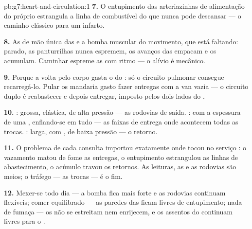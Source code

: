 \begin{solution}{pb:g7:heart-and-circulation:1}
\textbf{7.} O entupimento das arteriazinhas de alimentação do próprio
 estrangula a linha de combustível do  que nunca pode
descansar --- o caminho clássico para um infarto.

\textbf{8.} As  de mão única das  e a bomba muscular do
movimento, que está faltando: parado, as panturrilhas nunca espremem,
os avanços das  empacam e os  acumulam. Caminhar
espreme as  com ritmo --- o alívio é mecânico.

\textbf{9.} Porque a volta pelo corpo gasta o  do : só o
circuito pulmonar consegue recarregá-lo. Pular os  mandaria
 gasto fazer entregas com a van vazia --- o circuito duplo é
reabastecer e depois entregar, imposto pelos dois lados do .

\textbf{10.} : grossa, elástica, de alta pressão --- as rodovias
de saída. : com a espessura de uma , enfiando-se em tudo
--- as faixas de entrega onde acontecem todas as trocas. : larga,
com , de baixa pressão --- o retorno.

\textbf{11.} O problema de cada consulta importou exatamente onde
tocou no serviço : o vazamento matou de fome as entregas, o
entupimento estrangulou as linhas de abastecimento, o acúmulo travou
os retornos. As leituras, as  e as rodovias são meios; o
tráfego  --- as trocas --- é o fim.

\textbf{12.} Mexer-se todo dia --- a bomba fica mais forte e as
rodovias continuam flexíveis; comer equilibrado --- as paredes das
 ficam livres de entupimento; nada de fumaça --- os  não
se estreitam nem enrijecem, e os assentos do  continuam livres
para o .
\end{solution}
